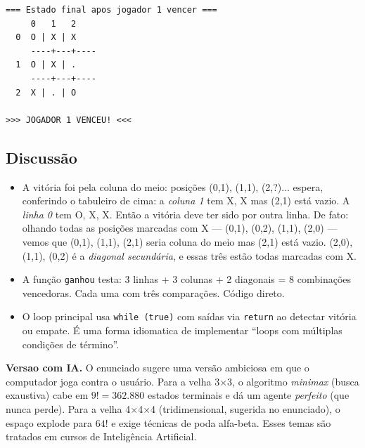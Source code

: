 \documentclass[11pt,a4paper]{article}
\begin{document}
\begin{saidabox}
\begin{lstlisting}[style=terminal]
=== Estado final apos jogador 1 vencer ===
     0   1   2
  0  O | X | X
     ----+---+----
  1  O | X | .
     ----+---+----
  2  X | . | O

>>> JOGADOR 1 VENCEU! <<<
\end{lstlisting}
\end{saidabox}

\subsection*{Discuss\~ao}

\begin{itemize}[leftmargin=*]
  \item A vit\'oria foi pela coluna do meio: posi\c{c}\~oes (0,1), (1,1), (2,?)... espera, conferindo o tabuleiro de cima: a \emph{coluna 1} tem X, X mas (2,1) est\'a vazio. A \emph{linha 0} tem O, X, X. Ent\~ao a vit\'oria deve ter sido por outra linha. De fato: olhando todas as posi\c{c}\~oes marcadas com X --- (0,1), (0,2), (1,1), (2,0) --- vemos que (0,1), (1,1), (2,1) seria coluna do meio mas (2,1) est\'a vazio. (2,0), (1,1), (0,2) \'e a \emph{diagonal secund\'aria}, e essas tr\^es est\~ao todas marcadas com X.
  \item A fun\c{c}\~ao \texttt{ganhou} testa: 3 linhas + 3 colunas + 2 diagonais = 8 combina\c{c}\~oes vencedoras. Cada uma com tr\^es compara\c{c}\~oes. C\'odigo direto.
  \item O loop principal usa \texttt{while (true)} com sa\'idas via \texttt{return} ao detectar vit\'oria ou empate. \'E uma forma idiomatica de implementar ``loops com m\'ultiplas condi\c{c}\~oes de t\'ermino''.
\end{itemize}

\begin{obseng}
\textbf{Versao com IA.} O enunciado sugere uma vers\~ao ambiciosa em que o computador joga contra o usu\'ario. Para a velha 3$\times$3, o algoritmo \emph{minimax} (busca exaustiva) cabe em $9! = 362{.}880$ estados terminais e d\'a um agente \emph{perfeito} (que nunca perde). Para a velha 4$\times$4$\times$4 (tridimensional, sugerida no enunciado), o espa\c{c}o explode para $64!$ e exige t\'ecnicas de poda alfa-beta. Esses temas s\~ao tratados em cursos de Intelig\^encia Artificial.
\end{obseng}

\end{document}
